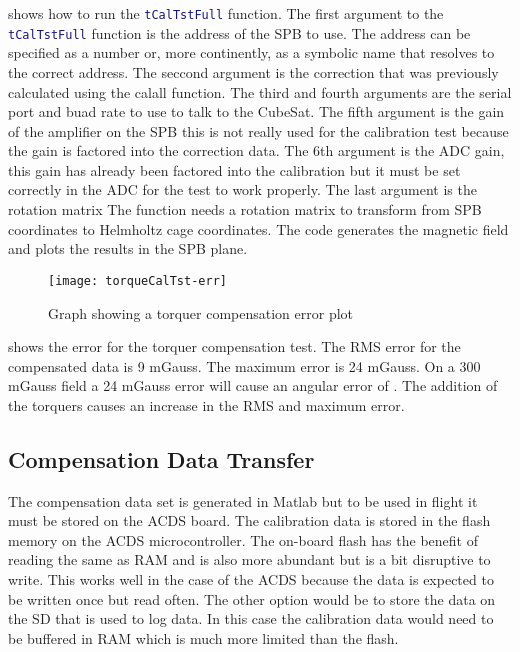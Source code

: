 shows how to run the \lstinline[style=code,language=Matlab]$tCalTstFull$ function. The first argument to the \lstinline[style=code,language=Matlab]$tCalTstFull$ function is the address of the \ac{SPB} to use. The address can be specified as a number or, more continently, as a symbolic name that resolves to the correct address. The seccond argument is the correction that was previously calculated using the calall function. The third and fourth arguments are the serial port and buad rate to use to talk to the CubeSat. The fifth argument is the gain of the amplifier on the \ac{SPB} this is not really used for the calibration test because the gain is factored into the correction data. The 6th argument is the \ac{ADC} gain, this gain has already been factored into the calibration but it must be set correctly in the \ac{ADC} for the test to work properly. The last argument is the rotation matrix  The function needs a rotation matrix to transform from \ac{SPB} coordinates to Helmholtz cage coordinates. The code generates the magnetic field and plots the results in the \ac{SPB} plane.

\begin{sidewaysfigure}
    \centering
    \texttt{[image: torqueCalTst-err]}
    \caption{Graph showing a torquer compensation error plot}
    \label{fig:tqerr}
\end{sidewaysfigure}

 shows the error for the torquer compensation test. The RMS error for the compensated data is 9 mGauss. The maximum error is 24 mGauss. On a 300 mGauss field a 24 mGauss error will cause an angular error of \textdegree. The addition of the torquers causes an increase in the RMS and maximum error.

\subsection{Compensation Data Transfer}

The compensation data set is generated in Matlab but to be used in flight it must be stored on the \ac{ACDS} board. The calibration data is stored in the flash memory on the \ac{ACDS} microcontroller. The on-board flash has the benefit of reading the same as \ac{RAM} and is also more abundant but is a bit disruptive to write. This works well in the case of the \ac{ACDS} because the data is expected to be written once but read often. The other option would be to store the data on the \ac{SD} that is used to log data. In this case the calibration data would need to be buffered in \ac{RAM} which is much more limited than the flash. 

